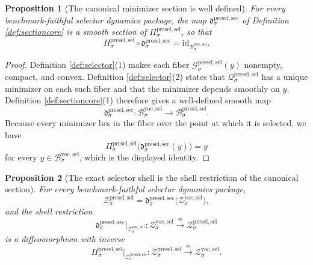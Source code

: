 \documentclass[11pt]{article}
\newcommand{\YoctoSelectorBody}[1]{\mathcal B_{#1}^{\mathrm{yoc,sel}}}
\newcommand{\YoctoSelectorShell}[1]{\mathcal Z_{#1}^{\mathrm{yoc,sel}}}
\newcommand{\PreSelectorMinSection}[1]{\mathfrak d_{#1}^{\mathrm{presel,sec}}}
\newcommand{\PreSectionSelectorBody}[1]{\mathcal B_{#1}^{\mathrm{presel,sel}}}
\newcommand{\PreSectionSelectorProj}[1]{\Pi_{#1}^{\mathrm{presel,sel}}}
\newcommand{\PreSectionSelectorFiber}[2]{\mathcal G_{#1}^{\mathrm{presel,sel}}(#2)}
\newcommand{\PreSectionSelectorFunctional}[1]{\mathscr Q_{#1}^{\mathrm{presel,sel}}}
\newcommand{\PreSectionSelectorShell}[1]{\mathcal Z_{#1}^{\mathrm{presel,sel}}}
\newtheorem{proposition}{Proposition}
\begin{document}
\begin{proposition}[The canonical minimizer section is well defined]
\label{prop:section}
For every benchmark-faithful selector dynamics package, the map \(\PreSelectorMinSection{\sigma}\) of Definition \ref{def:sectioncore} is a smooth section of \(\PreSectionSelectorProj{\sigma}\), so that
\[
\PreSectionSelectorProj{\sigma}\circ\PreSelectorMinSection{\sigma}
=
\mathrm{id}_{\YoctoSelectorBody{\sigma}}.
\]
\end{proposition}

\begin{proof}
Definition \ref{def:selector}(1) makes each fiber \(\PreSectionSelectorFiber{\sigma}{y}\) nonempty, compact, and convex. Definition \ref{def:selector}(2) states that \(\PreSectionSelectorFunctional{\sigma}\) has a unique minimizer on each such fiber and that the minimizer depends smoothly on \(y\). Definition \ref{def:sectioncore}(1) therefore gives a well-defined smooth map
\[
\PreSelectorMinSection{\sigma}:\YoctoSelectorBody{\sigma}\to\PreSectionSelectorBody{\sigma}.
\]
Because every minimizer lies in the fiber over the point at which it is selected, we have
\[
\PreSectionSelectorProj{\sigma}\bigl(\PreSelectorMinSection{\sigma}(y)\bigr)=y
\]
for every \(y\in\YoctoSelectorBody{\sigma}\), which is the displayed identity.
\end{proof}

\begin{proposition}[The exact selector shell is the shell restriction of the canonical section]
\label{prop:shell}
For every benchmark-faithful selector dynamics package,
\[
\PreSectionSelectorShell{\sigma}
=
\PreSelectorMinSection{\sigma}\bigl(\YoctoSelectorShell{\sigma}\bigr),
\]
and the shell restriction
\[
\PreSelectorMinSection{\sigma}\big|_{\YoctoSelectorShell{\sigma}}
:
\YoctoSelectorShell{\sigma}\xrightarrow{\cong}\PreSectionSelectorShell{\sigma}
\]
is a diffeomorphism with inverse
\[
\PreSectionSelectorProj{\sigma}\big|_{\PreSectionSelectorShell{\sigma}}
:
\PreSectionSelectorShell{\sigma}\xrightarrow{\cong}\YoctoSelectorShell{\sigma}.
\]
\end{proposition}
\end{document}
